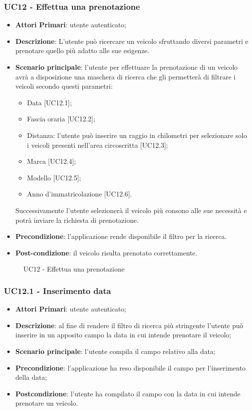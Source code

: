\subsubsection{UC12 - Effettua una prenotazione}
\begin{itemize}
	\item \textbf{Attori Primari}: utente autenticato;
	\item \textbf{Descrizione}: L'utente può ricercare un veicolo sfruttando diversi parametri e prenotare quello più adatto alle sue esigenze.
	\item \textbf{Scenario principale}: l'utente per effettuare la prenotazione di un veicolo avrà a disposizione una maschera di ricerca che gli permetterà di filtrare i veicoli secondo questi parametri:
	\begin{itemize}
		\item Data [UC12.1];
		\item Fascia oraria [UC12.2];
		\item Distanza: l'utente può inserire un raggio in chilometri per selezionare solo i veicoli presenti nell'area circoscritta [UC12.3]; 
		\item Marca [UC12.4];
		\item Modello [UC12.5];
		\item Anno d'immatricolazione [UC12.6].
	\end{itemize}
	Successivamente l'utente selezionerà il veicolo più consono alle sue necessità e potrà inviare la richiesta di prenotazione.
	\item \textbf{Precondizione}: l'applicazione rende disponibile il filtro per la ricerca.
	\item \textbf{Post-condizione}: il veicolo risulta prenotato correttamente.
\end{itemize} 
\begin{figure}[h]
	\centering
	\caption{UC12 - Effettua una prenotazione}
\end{figure}
\subsubsection{UC12.1 - Inserimento data}
\begin{itemize}
	\item \textbf{Attori Primari}: utente autenticato;
	\item \textbf{Descrizione}: al fine di rendere il filtro di ricerca più stringente l'utente può inserire in un apposito campo la data in cui intende prenotare il veicolo;
	\item \textbf{Scenario principale}: l'utente compila il campo relativo alla data;	
	\item \textbf{Precondizione}: l'applicazione ha reso disponibile il campo per l'inserimento della data;
	\item \textbf{Postcondizione}: l'utente ha compilato il campo con la data in cui intende prenotare un veicolo.	
\end{itemize}

